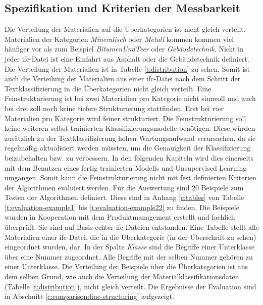 \subsection{Spezifikation und Kriterien der Messbarkeit}
\label{c:conception:fine-structuring:criteria}
Die Verteilung der Materialien auf die Überkategorien ist nicht gleich verteilt. Materialien der Kategorien \textit{Mineralisch} oder \textit{Metall} kommen kommen viel häufiger vor als zum Beispiel \textit{BitumenUndTeer} oder \textit{Gebäudetechnik}. Nicht in jeder \ac{ifc}-Datei ist eine Einfahrt aus Asphalt oder die Gebäudetechnik definiert. Die Verteilung der Materialien ist in Tabelle \ref{t:distribution} zu sehen. Somit ist auch die Verteilung der Materialien aus einer \ac{ifc}-Datei nach dem Schritt der Textklassifizierung in die Überkategorien nicht gleich verteilt. Eine Feinstrukturierung ist bei zwei Materialien pro Kategorie nicht sinnvoll und auch bei drei soll noch keine tiefere Strukturierung stattfinden. Erst bei vier Materialien pro Kategorie wird feiner strukturiert.
Die Feinstrukturierung soll keine weiteren selbst trainierten Klassifizierungsmodelle benötigen. Diese würden zusätzlich zu der Textklassifizierung hohen Wartungsaufwand verursachen, da sie regelmäßig aktualisiert werden müssten, um die Genauigkeit der Klassifizierung beizubehalten bzw. zu verbessern. In den folgenden Kapiteln wird dies einerseits mit dem Benutzen eines fertig trainierten Modells und Unsupervised Learning umgangen.
Somit kann die Feinstrukturierung nicht mit fest definierten Kriterien der Algorithmen evaluiert werden. Für die Auswertung sind 20 Beispiele zum Testen der Algorithmen definiert. Diese sind in Anhang \ref{c:tables} von Tabelle \ref{t:evaluation-example1} bis \ref{t:evaluation-example22} zu finden. Die Beispiele wurden in Kooperation mit dem Produktmanagement erstellt und fachlich überprüft. Sie sind auf Basis echter \ac{ifc}-Dateien entstanden. Eine Tabelle stellt alle Materialien einer \ac{ifc}-Datei, die in die Überkategorie (in der Überschrift zu sehen) eingeordnet wurden, dar. In der Spalte \textit{Klasse} sind die Begriffe einer Unterklasse über eine Nummer zugeordnet. Alle Begriffe mit der selben Nummer gehören zu einer Unterklasse. Die Verteilung der Beispiele über die Überkategorien ist aus dem selben Grund, wie auch die Verteilung der Materialklassifikationsdaten (Tabelle \ref{t:distribution}), nicht gleich verteilt. Die Ergebnisse der Evaluation sind in Abschnitt \ref{c:comparison:fine-structuring} aufgezeigt.



